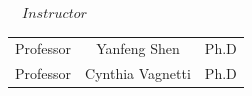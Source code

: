 \normalsize
\vspace*{1em}
\begin{center}
\large
$\hspace{1em}Instructor$\\
\vspace*{1em}
\begin{tabular}{lcl}
\large
Professor\hspace{0.5em}\vspace{0.3em} &\hspace{0.5em}Yanfeng Shen\hspace{0.5em}&\hspace{0.5em}Ph.D\\ 
Professor\hspace{0.5em} &\hspace{0.5em}Cynthia Vagnetti \hspace{0.5em}&\hspace{0.5em}Ph.D\\ 
\end{tabular}
\end{center}
